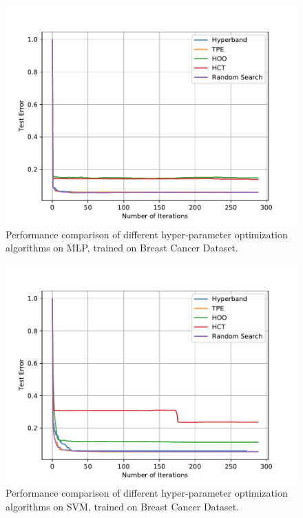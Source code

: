 \documentclass[runningheads,a4paper]{llncs}
\begin{document}
\begin{figure}[ht]
    \centering
    \includegraphics[scale=0.8]{img/uci/sk_mlp_1.pdf}
    \caption{Performance comparison of different hyper-parameter optimization algorithms on MLP, trained on Breast Cancer Dataset.}
    \label{sk_mlp_1}
\end{figure}

\begin{figure}[ht]
    \centering
    \includegraphics[scale=0.8]{img/uci/svm_1.pdf}
    \caption{Performance comparison of different hyper-parameter optimization algorithms on SVM, trained on Breast Cancer Dataset.}
    \label{svm_1}
\end{figure}
\end{document}
